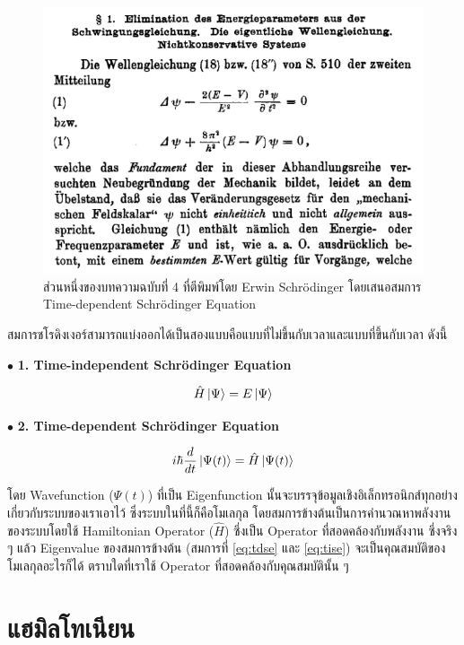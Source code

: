 \begin{figure}[H]
    \centering
    \includegraphics[width=0.8\linewidth]{fig/time-dep-schrodinger-eq.png}
    \caption{ส่วนหนึ่งของบทความฉบับที่ 4 ที่ตีพิมพ์โดย Erwin Schr\"{o}dinger โดยเสนอสมการ Time-dependent Schr\"{o}dinger 
    Equation}
    \label{fig:schrodinger_paper_4}
\end{figure}

สมการชโรดิงเงอร์สามารถแบ่งออกได้เป็นสองแบบคือแบบที่ไม่ขึ้นกับเวลาและแบบที่ขึ้นกับเวลา ดังนี้

\noindent $\bullet$ \textbf{1. Time-independent Schr\"{o}dinger Equation}

\begin{equation}\label{eq:tise}
    \hat{H}\ket{\Psi} = E \ket{\Psi}
\end{equation}

\noindent $\bullet$ \textbf{2. Time-dependent Schr\"{o}dinger Equation}

\begin{equation}\label{eq:tdse}
    i \hbar \frac{d}{d t} \ket{\Psi(t)} = \hat{H} \ket{\Psi(t)}
\end{equation}

โดย Wavefunction ($\Psi(t)$) ที่เป็น Eigenfunction นั้นจะบรรจุข้อมูลเชิงอิเล็กทรอนิกส์ทุกอย่างเกี่ยวกับระบบของเราเอาไว้%
\autocite{szabo1996,cramer2004,jensen2017} ซึ่งระบบในที่นี้ก็คือโมเลกุล โดยสมการข้างต้นเป็นการคำนวณหาพลังงานของระบบโดยใช้ 
Hamiltonian Operator ($\hat{H}$) ซึ่งเป็น Operator ที่สอดคล้องกับพลังงาน ซึ่งจริง ๆ แล้ว Eigenvalue ของสมการข้างต้น (สมการที่ 
\ref{eq:tdse} และ \ref{eq:tise}) จะเป็นคุณสมบัติของโมเลกุลอะไรก็ได้ ตราบใดที่เราใช้ Operator ที่สอดคล้องกับคุณสมบัตินั้น ๆ 

\section{แฮมิลโทเนียน}
\label{sec:hamiltonian}

